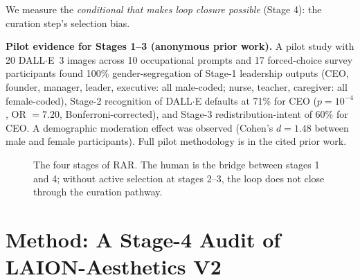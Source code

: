 \documentclass[manuscript, nonacm, screen, review]{acmart}
\begin{document}
We measure the \emph{conditional that makes loop closure possible} (Stage 4): the curation step's selection bias.

\textbf{Pilot evidence for Stages 1--3 (anonymous prior work).} A pilot study with 20 DALL$\cdot$E~3 images across 10 occupational prompts and 17 forced-choice survey participants found 100\% gender-segregation of Stage-1 leadership outputs (CEO, founder, manager, leader, executive: all male-coded; nurse, teacher, caregiver: all female-coded), Stage-2 recognition of DALL$\cdot$E defaults at 71\% for CEO ($p=10^{-4}$, OR $=7.20$, Bonferroni-corrected), and Stage-3 redistribution-intent of 60\% for CEO. A demographic moderation effect was observed (Cohen's $d=1.48$ between male and female participants). Full pilot methodology is in the cited prior work.

\begin{figure}[t]
\centering
{}
\caption{The four stages of RAR. The human is the bridge between stages 1 and 4; without active selection at stages 2--3, the loop does not close through the curation pathway.}
\label{fig:rar}
\end{figure}

\section{Method: A Stage-4 Audit of LAION-Aesthetics V2}
\label{sec:method}
\end{document}
